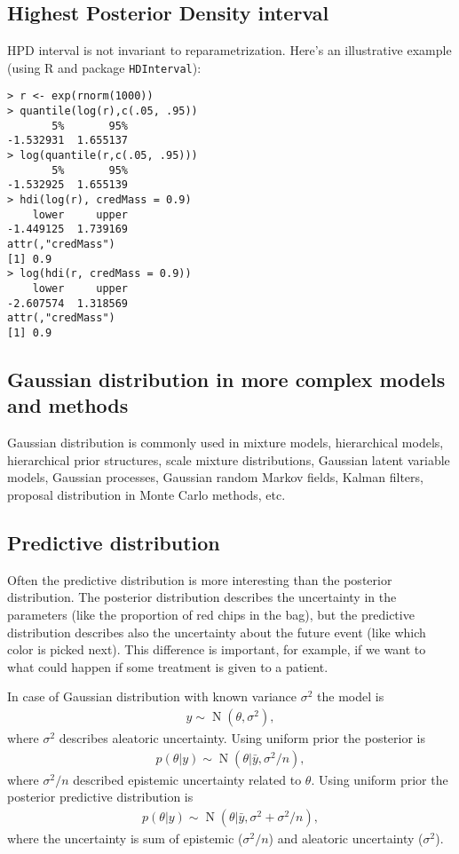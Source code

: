 \documentclass[a4paper,11pt,english]{article}
\DeclareMathOperator{\N}{N}
\begin{document}
\subsection*{Highest Posterior Density interval}

HPD interval is not invariant to reparametrization. Here's an illustrative
example (using R and package {\tt HDInterval}):
 {\small
\begin{verbatim}
> r <- exp(rnorm(1000))
> quantile(log(r),c(.05, .95))
       5%       95% 
-1.532931  1.655137 
> log(quantile(r,c(.05, .95)))
       5%       95% 
-1.532925  1.655139 
> hdi(log(r), credMass = 0.9)
    lower     upper 
-1.449125  1.739169 
attr(,"credMass")
[1] 0.9
> log(hdi(r, credMass = 0.9))
    lower     upper 
-2.607574  1.318569 
attr(,"credMass")
[1] 0.9
\end{verbatim}
}

\subsection*{Gaussian distribution in more complex models and methods}

Gaussian distribution is commonly used in mixture models, hierarchical
models, hierarchical prior structures, scale mixture distributions,
Gaussian latent variable models, Gaussian processes, Gaussian random
Markov fields, Kalman filters, proposal distribution in Monte Carlo
methods, etc.

\subsection*{Predictive distribution}

Often the predictive distribution is more interesting than the
posterior distribution. The posterior distribution describes the
uncertainty in the parameters (like the proportion of red chips in the
bag), but the predictive distribution describes also the uncertainty
about the future event (like which color is picked next). This
difference is important, for example, if we want to what could happen
if some treatment is given to a patient.

In case of Gaussian distribution with known variance $\sigma^2$ the model is
\begin{align*}
  y\sim \N(\theta,\sigma^2),
\end{align*}
where $\sigma^2$ describes aleatoric uncertainty.
Using uniform prior the posterior is 
\begin{align*}
  p(\theta|y) \sim \N(\theta|\bar{y},\sigma^2/n),
\end{align*}
where $\sigma^2/n$ described epistemic uncertainty related to $\theta$.
Using uniform prior the posterior predictive distribution is 
\begin{align*}
  p(\theta|y) \sim \N(\theta|\bar{y},\sigma^2+\sigma^2/n),
\end{align*}
where the uncertainty is sum of epistemic ($\sigma^2/n$) and aleatoric
uncertainty ($\sigma^2$).
\end{document}
